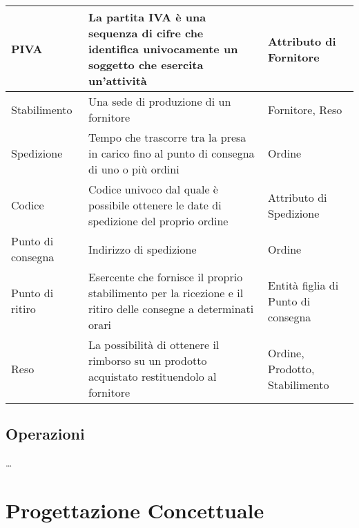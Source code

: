 \documentclass[11pt]{article}
\begin{document}
\begin{center}
\begin{tabularx}{0.98\textwidth} {
        | >{\raggedright\arraybackslash}X |
          >{\raggedright\arraybackslash}X |
          >{\raggedright\arraybackslash}X |
    }
        PIVA &
        La partita IVA è una sequenza di cifre che identifica univocamente un soggetto che esercita un'attività &
        Attributo di Fornitore \\ 
        \hline

        Stabilimento &
        Una sede di produzione di un fornitore &
        Fornitore, Reso \\ 
        \hline
        
        Spedizione &
        Tempo che trascorre tra la presa in carico fino al punto di consegna di uno o più ordini &
        Ordine \\ 
        \hline

        Codice &
        Codice univoco dal quale è possibile ottenere le date di spedizione del proprio ordine &
        Attributo di Spedizione \\ 
        \hline

        Punto di consegna &
        Indirizzo di spedizione &
        Ordine \\ 
        \hline

        Punto di ritiro &
        Esercente che fornisce il proprio stabilimento per la ricezione e il ritiro delle consegne a determinati orari &
        Entità figlia di Punto di consegna \\ 
        \hline

        Reso &
        La possibilità di ottenere il rimborso su un prodotto acquistato  restituendolo al fornitore &
        Ordine, Prodotto, Stabilimento \\ 
        \hline

    \end{tabularx}
\end{center}

\subsection{Operazioni}

\dots

\section{Progettazione Concettuale}
\end{document}
